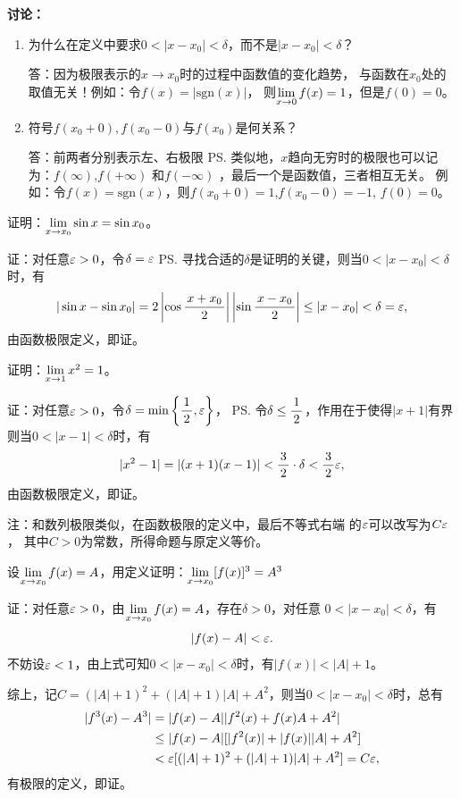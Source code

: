 \bs
{\bf 讨论：}
\begin{enumerate}
  \setlength{\itemindent}{1cm}
  \item 为什么在定义中要求$0<|x-x_0|<\delta$，而不是$|x-x_0|<\delta$？
   
   \quad 答：因为极限表示的$x\to x_0$时的过程中函数值的变化趋势，
   与函数在$x_0$处的取值无关！例如：令$f(x)=|\mathrm{sgn}(x)|$，
   则$\lim\limits_{x\to{0}}f(x)=1$，但是$f(0)=0$。
  \item 符号$f(x_0+0),f(x_0-0)$与$f(x_0)$是何关系？
  
  \quad 答：前两者分别表示左、右极限
  \ps{类似地，$x$趋向无穷时的极限也可以记为：$f(\infty)$,$f(+\infty)$
  和$f(-\infty)$}
  ，最后一个是函数值，三者相互无关。
  例如：令$f(x)=\mathrm{sgn}(x)$，则$f(x_0+0)=1$,$f(x_0-0)=-1$,
  $f(0)=0$。
\end{enumerate}

\bs
\egz 证明：$\lim\limits_{x\to{x_0}}\sin x=\sin x_0$。

证：对任意$\varepsilon>0$，令$\delta=\varepsilon$
\ps{寻找合适的$\delta$是证明的关键}，则当$0<|x-x_0|<\delta$时，有
$$|\sin x-\sin x_0|=2\left|\cos\displaystyle\frac{\,{x+x_0}\,}{\,{2}\,}\right|
\left|\sin\displaystyle\frac{\,{x-x_0}\,}{\,{2}\,}\right|\leq|x-x_0|<\delta=\varepsilon,$$
由函数极限定义，即证。\fin

\bs

\egz 证明：$\lim\limits_{x\to{1}}x^2=1$。

证：对任意$\varepsilon>0$，令$\delta=\min\left\{\displaystyle\frac{\,{1}\,}{\,{2}\,},\varepsilon\right\}$，
\ps{令$\delta\leq\displaystyle\frac{\,{1}\,}{\,{2}\,}$，作用在于使得$|x+1|$有界}
则当$0<|x-1|<\delta$时，有
$$|x^2-1|=|(x+1)(x-1)|<\displaystyle\frac{\,{3}\,}{\,{2}\,}\cdot\delta<\displaystyle\frac{\,{3}\,}{\,{2}\,}\varepsilon,$$
由函数极限定义，即证。\fin

注：和数列极限类似，在函数极限的定义中，最后不等式右端
的$\varepsilon$可以改写为$C\varepsilon$，
其中$C>0$为常数，所得命题与原定义等价。

\bs

\egz 设$\lim\limits_{x\to{x_0}}f(x)=A$，用定义证明：$\lim\limits_{x\to{x_0}}[f(x)]^3=A^3$

证：对任意$\varepsilon>0$，由$\lim\limits_{x\to{x_0}}f(x)=A$，存在$\delta>0$，对任意
$0<|x-x_0|<\delta$，有
$$|f(x)-A|<\varepsilon.$$
不妨设$\varepsilon<1$，由上式可知$0<|x-x_0|<\delta$时，有$|f(x)|<|A|+1$。

综上，记$C=(|A|+1)^2+(|A|+1)|A|+A^2$，则当$0<|x-x_0|<\delta$时，总有
\begin{align}
	|f^3(x)-A^3|&=|f(x)-A||f^2(x)+f(x)A+A^2|\notag\\
	&\leq |f(x)-A|[|f^2(x)|+|f(x)||A|+A^2]\notag\\
	&<\varepsilon[(|A|+1)^2+(|A|+1)|A|+A^2]=C\varepsilon\notag,
\end{align}
有极限的定义，即证。\fin

